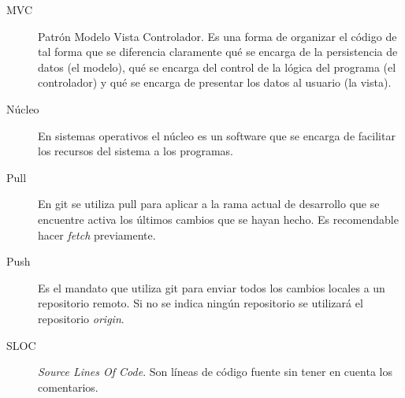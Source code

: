 \begin{description}
	\item[MVC] Patrón Modelo Vista Controlador. Es una forma de organizar el código de tal forma que se diferencia claramente qué se encarga de la persistencia de datos (el modelo), qué se encarga del control de la lógica del programa (el controlador) y qué se encarga de presentar los datos al usuario (la vista).
	
	\item[Núcleo] En sistemas operativos el núcleo es un software que se encarga de facilitar los recursos del sistema a los programas.
	
	\item[Pull] En git se utiliza pull para aplicar a la rama actual de desarrollo que se encuentre activa los últimos cambios que se hayan hecho. Es recomendable hacer \emph{fetch} previamente.
	
	\item[Push] Es el mandato que utiliza git para enviar todos los cambios locales a un repositorio remoto. Si no se indica ningún repositorio se utilizará el repositorio \emph{origin}.
	
	\item[SLOC] \emph{Source Lines Of Code}. Son líneas de código fuente sin tener en cuenta los comentarios.
\end{description}
